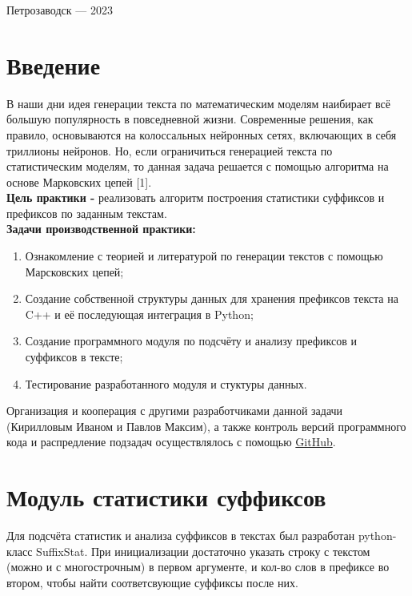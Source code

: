 \documentclass[a4paper,12pt]{article}
\begin{document}
\vfill

\begin{center}
\large
    Петрозаводск --- 2023
\end{center}

\newpage
\tableofcontents

\newpage
\section*{Введение}
В наши дни идея генерации текста по математическим моделям наибирает всё большую популярность в повседневной жизни. Современные решения, как правило, основываются на колоссальных нейронных сетях, включающих в себя триллионы нейронов. Но, если ограничиться генерацией текста по статистическим моделям, то данная задача решается с помощью алгоритма на основе Марковских цепей [1].	\\

	\textbf{Цель практики - } реализовать алгоритм построения статистики суффиксов и префиксов по заданным текстам.\\

	\textbf{Задачи производственной практики:}
\begin{enumerate}
	\item {Ознакомление с теорией и литературой по генерации текстов с помощью Марсковских цепей;}
	\item {Создание собственной структуры данных для хранения префиксов текста на C++ и её последующая интеграция в Python;}
	\item {Создание программного модуля по подсчёту и анализу префиксов и суффиксов в тексте;}
	\item {Тестирование разработанного модуля и стуктуры данных.}
\end{enumerate}

	Организация и кооперация с другими разработчиками данной задачи (Кирилловым Иваном и Павлов Максим), а также контроль версий программного кода и распредление подзадач осуществлялось с помощью \href{https://github.com/Flexagen/Construction-of-suffix-and-prefix-statistics}{GitHub}.
\newpage
\section{Модуль статистики суффиксов}

Для подсчёта статистик и анализа суффиксов в текстах был разработан python-класс SuffixStat. При инициализации достаточно указать строку с текстом (можно и с многострочным) в первом аргументе, и кол-во слов в префиксе во втором, чтобы найти соответсвующие суффиксы после них.
\end{document}
